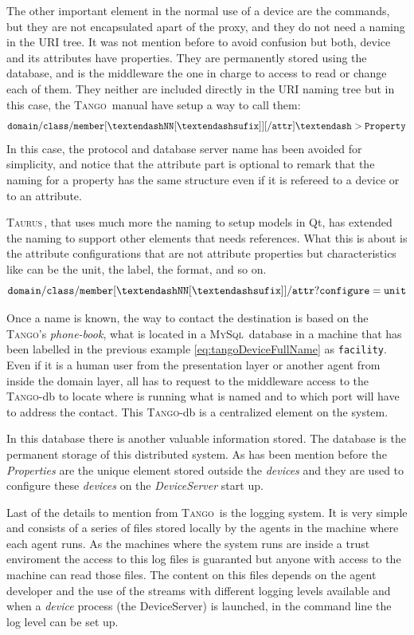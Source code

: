 \documentclass[10pt,a4paper,twoside]{llncs}
\newcommand{\tango}{\textsc{Tango}}
\newcommand{\taurus}{\textsc{Taurus}}
\newcommand{\mysql}{\textsc{MySql}}
\begin{document}
The other important element in the normal use of a device are the commands, but they are not encapsulated apart of the proxy, and they do not need a naming in the URI tree. It was not mention before to avoid confusion but both, device and its attributes have properties. They are permanently stored using the database, and is the middleware the one in charge to access to read or change each of them. They neither are included directly in the URI naming tree but in this case, the \tango\, manual \cite{tango81} have setup a way to call them:
\begin{equation}
    {\tt domain/class/member[\textendash NN[\textendash sufix]][/attr]\textendash >Property}\label{eq:tangoProperty}
\end{equation}
In this case, the protocol and database server name has been avoided for simplicity, and notice that the attribute part is optional to remark that the naming for a property has the same structure even if it is refereed to a device or to an attribute.

\taurus\,, that uses much more the naming to setup models in Qt, has extended the naming to support other elements that needs references. What this is about is the attribute configurations that are not attribute properties but characteristics like can be the unit, the label, the format, and so on.
\begin{equation}
    {\tt domain/class/member[\textendash NN[\textendash sufix]]/attr?configure=unit}\label{eq:taurusAttrConf}
\end{equation}

Once a name is known, the way to contact the destination is based on the \tango's \emph{phone-book}, what is located in a \mysql\, database in a machine that has been labelled in the previous example \ref{eq:tangoDeviceFullName} as {\tt facility}. Even if it is a human user from the presentation layer or another agent from inside the domain layer, all has to request to the middleware access to the \tango-db to locate where is running what is named and to which port will have to address the contact. This \tango-db is a centralized element on the system.

In this database there is another valuable information stored. The database is the permanent storage of this distributed system. As has been mention before the \emph{Properties} are the unique element stored outside the \emph{devices} and they are used to configure these \emph{devices} on the \emph{DeviceServer} start up.

Last of the details to mention from \tango\, is the logging system. It is very simple and consists of a series of files stored locally by the agents in the machine where each agent runs. As the machines where the system runs are inside a trust enviroment the access to this log files is guaranted but anyone with access to the machine can read those files. The content on this files depends on the agent developer and the use of the streams with different logging levels available and when a \emph{device} process (the DeviceServer) is launched, in the command line the log level can be set up.
\end{document}
